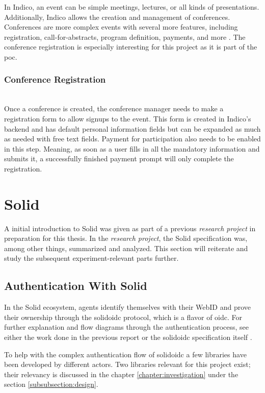 In Indico, an event can be simple meetings, lectures, or all kinds of presentations. Additionally, Indico allows the creation and management of conferences. Conferences are more complex events with several more features, including registration, call-for-abstracts, program definition, payments, and more \cite{cern-indico-docs}. The conference registration is especially interesting for this project as it is part of the \gls{poc}.

\subsubsection{Conference Registration}\mbox{}\\

Once a conference is created, the conference manager needs to make a registration form to allow signups to the event. This form is created in Indico's backend and has default personal information fields but can be expanded as much as needed with free text fields. Payment for participation also needs to be enabled in this step. Meaning, as soon as a user fills in all the mandatory information and submits it, a successfully finished payment prompt will only complete the registration.

\section{Solid}

A initial introduction to Solid was given as part of a previous \textit{research project} \cite{cern-solid-investigation-spec} in preparation for this thesis. In the \textit{research project}, the Solid specification was, among other things, summarized and analyzed. This section will reiterate and study the subsequent experiment-relevant parts further.

\subsection{Authentication With Solid}

In the Solid ecosystem, agents identify themselves with their WebID and prove their ownership through the \gls{solidoidc} protocol, which is a flavor of \gls{oidc}. For further explanation and flow diagrams through the authentication process, see either the work done in the previous report \cite{cern-solid-investigation-spec} or the \gls{solidoidc} specification itself \cite{solid-ecosystem-oidc}.

To help with the complex authentication flow of \gls{solidoidc} a few libraries have been developed by different actors. Two libraries relevant for this project exist; their relevancy is discussed in the chapter \ref{chapter:investigation} under the section \ref{subsubsection:design}.

